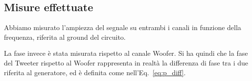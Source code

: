 \documentclass[../Relazione_circuiti]{subfiles}
\begin{document}
\subsection{Misure effettuate}
  Abbiamo misurato l'ampiezza del segnale su entrambi i canali in funzione della frequenza, riferita al ground del
  circuito.

  La fase invece è stata misurata rispetto al canale Woofer. Si ha quindi che la fase del Tweeter rispetto al Woofer
  rappresenta in realtà la differenza di fase tra i due riferita al generatore, ed è definita come nell'Eq.
     \,\eqref{eq:p_diff}.
\end{document}
